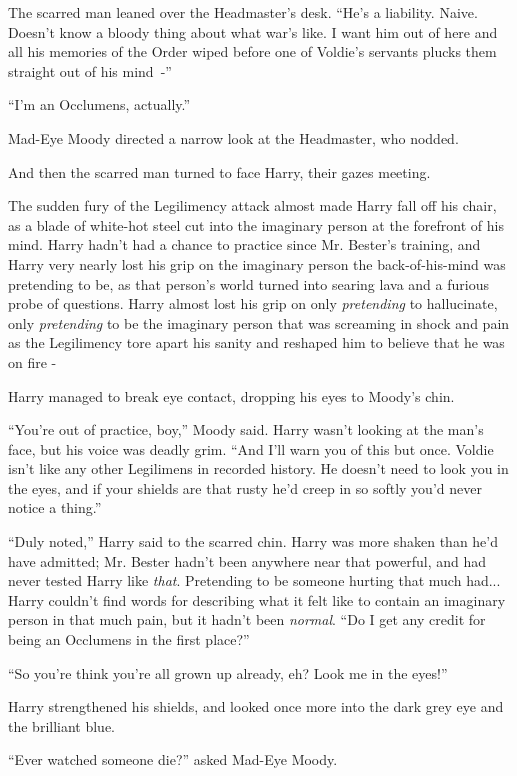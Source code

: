 The scarred man leaned over the Headmaster's desk. ``He's a liability. Naive. Doesn't know a bloody thing about what war's like. I want him out of here and all his memories of the Order wiped before one of Voldie's servants plucks them straight out of his mind~-''

``I'm an Occlumens, actually.''

Mad-Eye Moody directed a narrow look at the Headmaster, who nodded.

And then the scarred man turned to face Harry, their gazes meeting.

The sudden fury of the Legilimency attack almost made Harry fall off his chair, as a blade of white-hot steel cut into the imaginary person at the forefront of his mind. Harry hadn't had a chance to practice since Mr. Bester's training, and Harry very nearly lost his grip on the imaginary person the back-of-his-mind was pretending to be, as that person's world turned into searing lava and a furious probe of questions. Harry almost lost his grip on only \emph{pretending} to hallucinate, only \emph{pretending} to be the imaginary person that was screaming in shock and pain as the Legilimency tore apart his sanity and reshaped him to believe that he was on fire -

Harry managed to break eye contact, dropping his eyes to Moody's chin.

``You're out of practice, boy,'' Moody said. Harry wasn't looking at the man's face, but his voice was deadly grim. ``And I'll warn you of this but once. Voldie isn't like any other Legilimens in recorded history. He doesn't need to look you in the eyes, and if your shields are that rusty he'd creep in so softly you'd never notice a thing.''

``Duly noted,'' Harry said to the scarred chin. Harry was more shaken than he'd have admitted; Mr. Bester hadn't been anywhere near that powerful, and had never tested Harry like \emph{that}. Pretending to be someone hurting that much had... Harry couldn't find words for describing what it felt like to contain an imaginary person in that much pain, but it hadn't been \emph{normal}. ``Do I get any credit for being an Occlumens in the first place?''

``So you're think you're all grown up already, eh? Look me in the eyes!''

Harry strengthened his shields, and looked once more into the dark grey eye and the brilliant blue.

``Ever watched someone die?'' asked Mad-Eye Moody.

